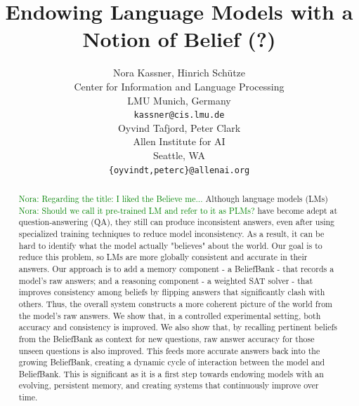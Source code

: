 \documentclass[11pt]{article}
\title{Endowing Language Models with a Notion of Belief (?)}
\author{Nora Kassner, Hinrich Sch{\"u}tze \\
Center for Information and Language Processing \\
LMU Munich, Germany \\
\texttt{kassner@cis.lmu.de} \\ \And
Oyvind Tafjord, Peter Clark \\
Allen Institute for AI \\
Seattle, WA \\
\texttt{\{oyvindt,peterc\}@allenai.org} \\
}
\newcommand{\nk}[1]{\textcolor{green}{Nora: #1}}
\begin{document}
\maketitle
\begin{abstract}
\nk{Regarding the title: I liked the Believe me...}
Although language models (LMs) \nk{Should we call it pre-trained LM and refer to it as PLMs?} have become adept at question-answering (QA), they
still can produce inconsistent answers, 
even after using specialized training techniques to reduce model inconsistency. As a result, it can be hard to identify
what the model actually
"believes" about the world. Our goal is to reduce this problem, so LMs are 
more globally consistent and accurate in their answers. Our approach is to add a memory
component - a BeliefBank - that records a model's raw 
answers; and a reasoning
component - a weighted SAT solver - that improves consistency among beliefs by
flipping answers that significantly clash with others. Thus, the overall system
constructs a more coherent picture of the world from the model's raw answers.
We show that, in a controlled experimental setting, 
both accuracy and consistency
is improved. We also show that, by recalling pertinent beliefs from the
BeliefBank as context for new questions, raw answer accuracy for those unseen
questions is also improved. This feeds more accurate answers back into the growing
BeliefBank, creating a dynamic cycle of interaction between the model and BeliefBank.
This is significant as it is a first step towards endowing models with an evolving,
persistent memory, and creating systems that continuously improve over time.
\end{abstract}
\end{document}
